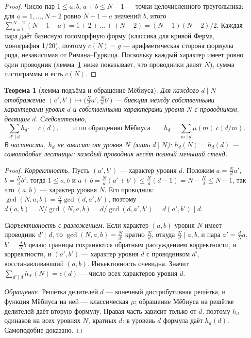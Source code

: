 \documentclass[11pt,a4paper]{article}
\theoremstyle{plain}
\newtheorem{theorem}{Теорема}
\theoremstyle{definition}
\theoremstyle{remark}
\begin{document}
\begin{proof}
Число пар $1\le a,b$, $a+b\le N-1$ --- точки целочисленного
треугольника: для $a=1,\dots,N-2$ ровно $N-1-a$ значений $b$,
итого $\sum_{a=1}^{N-2}(N-1-a)=1+2+\dots+(N-2)=(N-1)(N-2)/2$.
Каждая пара даёт базисную голоморфную форму (классика для кривой
Ферма, монография 1/20), поэтому $c(N)=g$ --- арифметическая
сторона формулы рода, независимая от Римана--Гурвица. Поскольку
каждый характер имеет ровно один проводник
(лемма~\ref{th:lift} ниже показывает, что проводники делят $N$),
сумма гистограммы и есть $c(N)$.
\end{proof}

\begin{theorem}[лемма подъёма и обращение Мёбиуса]\label{th:lift}
Для каждого $d\mid N$ отображение
$(a',b')\mapsto\big(\tfrac{N}{d}a',\tfrac{N}{d}b'\big)$ --- биекция
между собственными характерами уровня $d$ и собственными
характерами уровня $N$ с проводником, делящим $d$. Следовательно,
\[
  \sum_{d'\mid d}h_{d'}=c(d),
  \qquad\text{и по обращению Мёбиуса}\qquad
  h_d=\sum_{m\mid d}\mu(m)\,c(d/m).
\]
В частности, $h_d$ не зависит от уровня $N$ (лишь $d\mid N$):
$h_d(N)=h_d(d)$ --- \emph{самоподобие лестницы}: каждый проводник
несёт полный меньший стенд.
\end{theorem}

\begin{proof}
\emph{Корректность.} Пусть $(a',b')$ --- характер уровня $d$.
Положим $a=\tfrac{N}{d}a'$, $b=\tfrac{N}{d}b'$: тогда
$1\le a,b$ и $a+b=\tfrac{N}{d}(a'+b')\le\tfrac{N}{d}(d-1)
=N-\tfrac{N}{d}\le N-1$, так что $(a,b)$ --- характер уровня $N$.
Его проводник: $\gcd(N,a,b)=\tfrac{N}{d}\gcd(d,a',b')$, поэтому
$d(a,b)=N/\gcd(N,a,b)=d/\gcd(d,a',b')=d(a',b')\mid d$.

\emph{Сюръективность с разложением.} Если характер $(a,b)$
уровня $N$ имеет проводник $d'\mid d$, то
$\gcd(N,a,b)=\tfrac{N}{d'}$ кратно $\tfrac{N}{d}$, откуда
$\tfrac{N}{d}\mid a,b$, и пара $a'=\tfrac{d}{N}a$,
$b'=\tfrac{d}{N}b$ целая; границы сохраняются обратным
рассуждением корректности, и
корректности, и $(a',b')$ --- характер уровня $d$ с проводником
$d'$, восстанавливающий $(a,b)$. Инъективность очевидна. Значит
$\sum_{d'\mid d}h_{d'}(N)=c(d)$ --- число всех характеров
уровня $d$.

\emph{Обращение.} Решётка делителей $d$ --- конечный
дистрибутивная решётка, и функция Мёбиуса на ней --- классическая
$\mu$; обращение Мёбиуса на решётке делителей даёт вторую
формулу. Правая часть зависит только от $d$, поэтому $h_d$
одинаков на всех уровнях $N$, кратных $d$: в уровень $d$ формула
даёт $h_d(d)$. Самоподобие доказано.
\end{proof}
\end{document}
